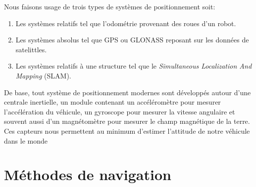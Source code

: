 Nous faisons usage de trois types de systèmes de positionnement soit:
\begin{enumerate}
  \item Les systèmes relatifs tel que l'odométrie provenant des roues d'un robot.
  \item Les systèmes absolus tel que GPS ou GLONASS reposant sur les données de satelittles.
  \item Les systèmes relatifs à une structure tel que le \textit{Simultaneous Localization And Mapping} (SLAM).
\end{enumerate}

De base, tout système de positionnement modernes sont développés autour d'une centrale inertielle, un module contenant un accéléromètre pour mesurer l'accélération du véhicule, un gyroscope pour mesurer la vitesse angulaire et souvent aussi d'un magnétomètre pour mesurer le champ magnétique de la terre. Ces capteurs nous permettent au minimum d'estimer l'attitude de notre véhicule dans le monde

\section{Méthodes de navigation}
